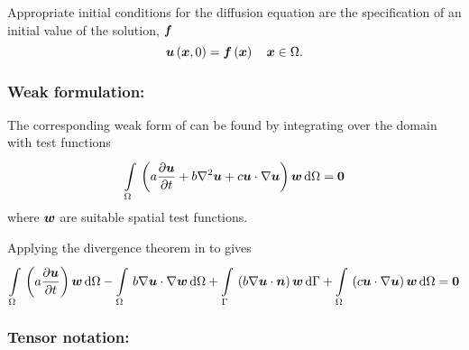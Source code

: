 Appropriate initial conditions for the diffusion equation are the
specification of an initial value of the solution, $ \boldsymbol{f} $ \ie
\begin{equation}
  \fnof{\vectr{u}}{\vectr{x},0} = \fnof{\vectr{f}}{\vectr{x}} \quad \vectr{x}\in\Omega.
  \label{eqn:BurgersInitialC} 
\end{equation}

\subsubsection{Weak formulation:}

The corresponding weak form of  can be
found by integrating over the domain with test functions \ie
\begin{equation}
  \gint{\Omega}{}{\pbrac{a\delby{\vectr{u}}{t}+
      b\laplacian{}{\vectr{u}}+
      c\dotprod{\vectr{u}}{\gradient{}{\vectr{u}}}}\vectr{w}}{\Omega}=\vectr{0}
  \label{eqn:Burgersweakform1}
\end{equation}
where $ \boldsymbol{w} $ are suitable spatial test functions.

Applying the divergence theorem in  to  gives
\begin{equation}
  \gint{\Omega}{}{\pbrac{a\delby{\vectr{u}}{t}}\vectr{w}}{\Omega}-
      \gint{\Omega}{}{b\dotprod{\gradient{}{\vectr{u}}}{\gradient{}{\vectr{w}}}}{\Omega}
      +\gint{\Gamma}{}{\pbrac{b\dotprod{\gradient{}{\vectr{u}}}{\normal}}\vectr{w}}{\Gamma}+
      \gint{\Omega}{}{\pbrac{c\dotprod{\vectr{u}}{\gradient{}{\vectr{u}}}}\vectr{w}}{\Omega}
      =\vectr{0}
  \label{eqn:Burgersweakform2}
\end{equation}

\subsubsection{Tensor notation:}

